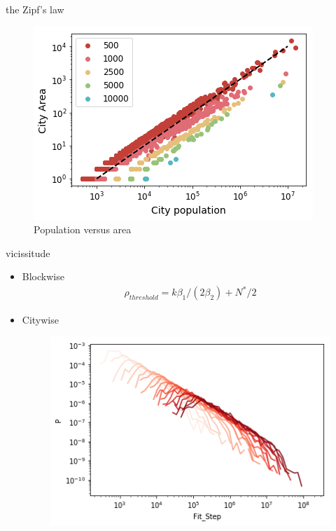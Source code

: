 \documentclass{beamer}
\begin{document}
\begin{frame}{the Zipf's law}
  \begin{figure}
    \includegraphics[width = 0.8\linewidth]{pics/pop-area.png}
    \caption{Population versus area}
  \end{figure}
\end{frame}

\begin{frame}{vicissitude}
  \begin{itemize}
    \item Blockwise
  \begin{align}\rho_{threshold} = k\beta_1/(2\beta_2)+N^*/2\end{align}
    \item Citywise
    \begin{figure}
      \includegraphics[width = 0.8\linewidth]{pics/step_number.png}
    \end{figure}
  \end{itemize}
\end{frame}
\end{document}
